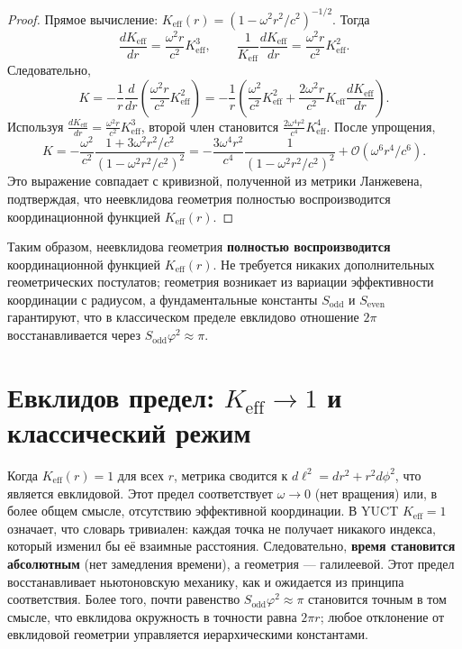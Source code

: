 \documentclass[12pt,a4paper]{article}
\newcommand{\Sodd}{S_{\mathrm{odd}}}
\newcommand{\Seven}{S_{\mathrm{even}}}
\begin{document}
	\begin{proof}
		Прямое вычисление: \(K_{\mathrm{eff}}(r) = (1 - \omega^2 r^2/c^2)^{-1/2}\). Тогда
		\[
		\frac{dK_{\mathrm{eff}}}{dr} = \frac{\omega^2 r}{c^2} K_{\mathrm{eff}}^3,\qquad
		\frac{1}{K_{\mathrm{eff}}} \frac{dK_{\mathrm{eff}}}{dr} = \frac{\omega^2 r}{c^2} K_{\mathrm{eff}}^2.
		\]
		Следовательно,
		\[
		K = -\frac{1}{r} \frac{d}{dr}\left( \frac{\omega^2 r}{c^2} K_{\mathrm{eff}}^2 \right) = -\frac{1}{r} \left( \frac{\omega^2}{c^2} K_{\mathrm{eff}}^2 + \frac{2\omega^2 r}{c^2} K_{\mathrm{eff}} \frac{dK_{\mathrm{eff}}}{dr} \right).
		\]
		Используя \(\frac{dK_{\mathrm{eff}}}{dr} = \frac{\omega^2 r}{c^2} K_{\mathrm{eff}}^3\), второй член становится \(\frac{2\omega^4 r^2}{c^4} K_{\mathrm{eff}}^4\). После упрощения,
		\[
		K = -\frac{\omega^2}{c^2} \frac{1 + 3\omega^2 r^2/c^2}{(1 - \omega^2 r^2/c^2)^2} = -\frac{3\omega^4 r^2}{c^4} \frac{1}{(1 - \omega^2 r^2/c^2)^2} + \mathcal{O}(\omega^6 r^4/c^6).
		\]
		Это выражение совпадает с кривизной, полученной из метрики Ланжевена, подтверждая, что неевклидова геометрия полностью воспроизводится координационной функцией \(K_{\mathrm{eff}}(r)\).
	\end{proof}
	
	Таким образом, неевклидова геометрия \textbf{полностью воспроизводится} координационной функцией \(K_{\mathrm{eff}}(r)\). Не требуется никаких дополнительных геометрических постулатов; геометрия возникает из вариации эффективности координации с радиусом, а фундаментальные константы \(\Sodd\) и \(\Seven\) гарантируют, что в классическом пределе евклидово отношение \(2\pi\) восстанавливается через \(\Sodd \varphi^2 \approx \pi\).
	
	\section{Евклидов предел: \(K_{\mathrm{eff}} \to 1\) и классический режим}
	\label{sec:euc-limit}
	
	Когда \(K_{\mathrm{eff}}(r) = 1\) для всех \(r\), метрика сводится к \(d\ell^2 = dr^2 + r^2 d\phi^2\), что является евклидовой. Этот предел соответствует \(\omega \to 0\) (нет вращения) или, в более общем смысле, отсутствию эффективной координации. В YUCT \(K_{\mathrm{eff}} = 1\) означает, что словарь тривиален: каждая точка не получает никакого индекса, который изменил бы её взаимные расстояния. Следовательно, \textbf{время становится абсолютным} (нет замедления времени), а геометрия — галилеевой. Этот предел восстанавливает ньютоновскую механику, как и ожидается из принципа соответствия. Более того, почти равенство \(\Sodd \varphi^2 \approx \pi\) становится точным в том смысле, что евклидова окружность в точности равна \(2\pi r\); любое отклонение от евклидовой геометрии управляется иерархическими константами.
	
\end{document}
